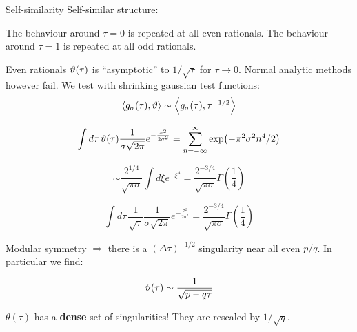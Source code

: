 \documentclass{beamer}
\begin{document}
\begin{frame}{Self-similarity}
    Self-similar structure:

    \begin{center}
        \Large The behaviour around $\tau = 0$ is repeated at all even rationals. The behaviour around $\tau=1$ is repeated at all odd rationals.
    \end{center}
\end{frame}

\begin{frame}{Even rationals}
        $\vartheta(\tau)$ is ``asymptotic'' to $1/\sqrt{\tau}$ for $\tau \rightarrow 0$. Normal analytic methods however fail. We test with shrinking gaussian test functions:
\begin{equation}
    \left\langle g_\sigma(\tau), \vartheta \right\rangle \sim \left\langle g_\sigma(\tau) , \tau^{-1/2} \right\rangle
    \label{}
\end{equation}

\vfill

        \[\int d\tau \, \vartheta(\tau) \frac{1}{\sigma\sqrt{2\pi}} e^{-\frac{\tau^2}{2\sigma^2}} = \sum_{n=-\infty}^\infty \exp(-\pi^2 \sigma^2 n^4 / 2) \]
    
        \[\sim \frac{2^{1/4}}{\sqrt{\pi \sigma}} \int d\xi e^{-\xi^4} = \frac{2^{-3/4}}{\sqrt{\pi\sigma}} \Gamma\left(\frac{1}{4}\right) \]


        \[ \int d\tau \, \frac{1}{\sqrt \tau} \frac{1}{\sigma \sqrt{2\pi}} e^{-\frac{\tau^2}{2\sigma^2}}  = \frac{2^{-3/4}}{\sqrt{\pi \sigma}} \Gamma\left(\frac{1}{4}\right) \]


\end{frame}

\begin{frame}



\vfill

Modular symmetry $\Rightarrow$ there is a $(\Delta \tau)^{-1/2}$ singularity near all even $p/q$. In particular we find:

\begin{equation}
    \vartheta(\tau) \sim \frac{1}{\sqrt{p - q\tau}}
    \label{}
\end{equation}

$\theta(\tau)$ has a \textbf{dense} set of singularities! They are rescaled by $1/\sqrt{q}$.



\end{frame}
\end{document}
